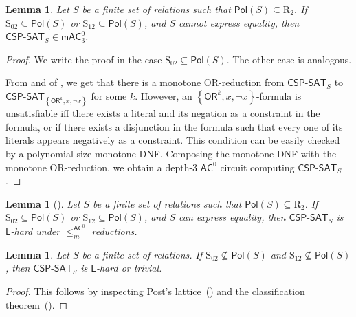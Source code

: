 \documentclass[10pt,a4paper]{article}
\newtheorem{lemma}[theorem]{Lemma}
\newcommand{\complexityfont}[1]{\mathsf{#1}}
\def\AC           {\complexityfont{AC}}
\def\mAC          {\complexityfont{mAC}}
\def\OR           {\complexityfont{OR}}
\renewcommand{\L} {\complexityfont{L}}
\def\sseq{\subseteq}
\newcommand{\set}[1]{\left\{#1\right\}}
\newcommand{\CSPf}[1]{\mathsf{CSP}\text{-}\mathsf{SAT}_{#1}}
\newcommand{\Pol}{\mathsf{Pol}}
\newcommand{\acmred}{\leq^{\AC^0}_m\!}
\newcommand{\clonefont}[1]{\mathrm{#1}}
\begin{document}
\begin{lemma}
    \label{lem:ac0-cspsat}
    Let $S$ be a finite set of relations
    such that $\Pol(S) \sseq \clonefont{R_2}$.
    If $\clonefont{S_{02}} \sseq \Pol(S)$
    or
    $\clonefont{S_{12}} \sseq \Pol(S)$,
    and $S$ cannot express equality,
    then
    $\CSPf{S} \in 
    \mAC^0_3$.
\end{lemma}
\begin{proof}
    We write the proof in the case
    $\clonefont{S_{02}} \sseq \Pol(S)$.
    The other case is analogous.

    From  and
     of ,
    we get that
    there is a monotone OR-reduction
    from
    $\CSPf{S}$ to
    $\CSPf{\set{\OR^k, x, \neg x}}$ for some $k$.
    However, an $\set{\OR^k, x, \neg x}$-formula
    is unsatisfiable iff
    there exists a literal and its negation as a constraint in the formula,
    or if there exists a disjunction
    in the formula
    such that
    every one of its literals appears negatively as a constraint.
    This condition can be easily checked by a polynomial-size
    monotone DNF.
    Composing the monotone DNF with the monotone OR-reduction,
    we obtain a depth-3 $\AC^0$ circuit computing
    $\CSPf{S}$.
\end{proof}

\begin{lemma}[]
    \label{lem:equality-lhard}
    Let $S$ be a finite set of relations
    such that $\Pol(S) \sseq \clonefont{R_2}$.
    If 
    $\clonefont{S_{02}} \sseq \Pol(S)$
    or
    $\clonefont{S_{12}} \sseq \Pol(S)$,
    and $S$ can express equality,
    then
    $\CSPf{S}$ is $\L$-hard
    under $\acmred$ reductions.
\end{lemma}



\begin{lemma}
    \label{lem:everything-lhard}
    Let $S$ be a finite set of relations.
    If 
    $\clonefont{S_{02}} \not\sseq \Pol(S)$
    and
    $\clonefont{S_{12}} \not \sseq \Pol(S)$,
    then
    $\CSPf{S}$ is $\L$-hard or trivial.
\end{lemma}
\begin{proof}
    This
    follows by 
    inspecting
    Post's 
    lattice~()
    and the classification theorem~().
\end{proof}
\end{document}
